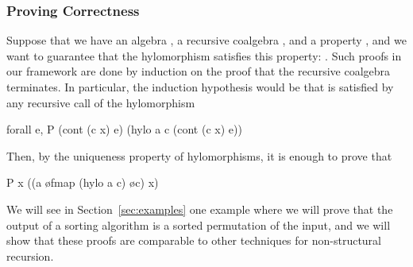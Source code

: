 \documentclass[a4paper,anonymous, UKenglish,cleveref, autoref, thm-restate]{lipics-v2021}
\begin{document}
%

\subsubsection{Proving Correctness}

Suppose that we have an algebra , a recursive coalgebra
, and a property , and we want to
guarantee that the hylomorphism satisfies this property:
.
Such proofs in our framework are done by induction on the proof that the
recursive coalgebra terminates. In particular, the induction hypothesis would be
that  is satisfied by any recursive call of the hylomorphism
\begin{coqcode}
forall e, P (cont (c x) e) (hylo a c (cont (c x) e))
\end{coqcode}
\noindent
Then, by the uniqueness property of hylomorphisms, it is enough to prove that
\begin{coqcode}
P x ((a \o fmap (hylo a c) \o c) x)
\end{coqcode}
We will see in Section~\ref{sec:examples} one example where we will prove that
the output of a sorting algorithm is a sorted permutation of the input, and we
will show that these proofs are comparable to other techniques for
non-structural recursion.
\end{document}

